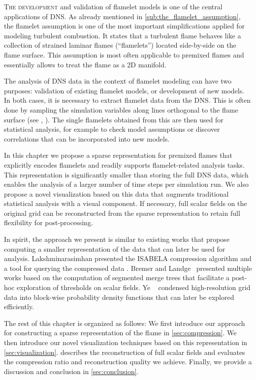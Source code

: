 \vspace{-2\baselineskip}\lettrine[loversize=0.02, lhang=0.03,
findent=-0.7pt]{T}{he development} and validation of flamelet models is one of
the central applications of \ac{DNS}.
%
As already mentioned in \cref{sub:the_flamelet_assumption}, the flamelet
assumption is one of the most important simplifications applied for modeling
turbulent combustion.
%
It states that a turbulent flame behaves like a collection of strained laminar
flames (``flamelets'') located side-by-side on the flame surface.
%
This assumption is most often applicable to premixed flames and essentially
allows to treat the flame as a \ac{2D} manifold.
%

%
The analysis of \ac{DNS} data in the context of flamelet modeling can have
two purposes: validation of existing flamelet models, or development of new
models.
%
In both cases, it is necessary to extract flamelet data from the \ac{DNS}.
%
This is often done by sampling the simulation variables along lines orthogonal
to the flame surface (see \eg, \cite{Zistl2009}).
%
The single flamelets obtained from this are then used for statistical analysis,
for example to check model assumptions or discover correlations that can be
incorporated into new models.
%

%
In this chapter we propose a sparse representation for premixed flames that
explicitly encodes flamelets and readily supports flamelet-related analysis
tasks.
%
This representation is significantly smaller than storing the full DNS data,
which enables the analysis of a larger number of time steps per simulation run.
%
We also propose a novel visualization based on this data that augments
traditional statistical analysis with a visual component.
%
If necessary, full scalar fields on the original grid can be reconstructed
from the sparse representation to retain full flexibility for post-processing.
%

%
In spirit, the approach we present is similar to existing works that propose
computing a smaller representation of the data that can later be used for
analysis.
%
Lakshminarasimhan \etal{} presented the ISABELA compression algorithm
\cite{Lakshminarasimhan2011} and a tool for querying the compressed data
\cite{Lakshminarasimhan2011a}.
%
Bremer and Landge~\cite{Bremer2009,Bremer2011,Bremer2010,Landge2014} presented
multiple works based on the computation of segmented merge trees that facilitate
a post-hoc exploration of thresholds on scalar fields.
%
Ye \etal{}~\cite{Ye2016} condensed high-resolution grid data into block-wise
probability density functions that can later be explored efficiently.
%

%
The rest of this chapter is organized as follows:
%
We first introduce our approach for constructing a sparse representation of the
flame in \cref{sec:compression}.
%
We then introduce our novel visualization techniques based on this
representation in \cref{sec:visualization}.
%
 describes the reconstruction of full scalar fields and
evaluates the compression ratio and reconstruction quality we achieve.
%
Finally, we provide a discussion and conclusion in \cref{sec:conclusion}.
%